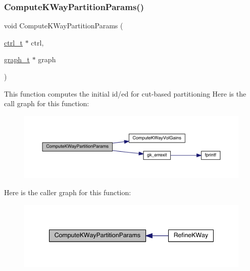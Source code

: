 \subsubsection{\texorpdfstring{Compute\+K\+Way\+Partition\+Params()}{ComputeKWayPartitionParams()}}
{\footnotesize\ttfamily void Compute\+K\+Way\+Partition\+Params (\begin{DoxyParamCaption}\item[{\hyperlink{a00742}{ctrl\+\_\+t} $\ast$}]{ctrl,  }\item[{\hyperlink{a00734}{graph\+\_\+t} $\ast$}]{graph }\end{DoxyParamCaption})}

This function computes the initial id/ed for cut-\/based partitioning Here is the call graph for this function\+:\nopagebreak
\begin{figure}[H]
\begin{center}
\leavevmode
\includegraphics[width=350pt]{a00915_afd723ab2f44ffaa25d1d9f1909e06dfd_cgraph}
\end{center}
\end{figure}
Here is the caller graph for this function\+:\nopagebreak
\begin{figure}[H]
\begin{center}
\leavevmode
\includegraphics[width=344pt]{a00915_afd723ab2f44ffaa25d1d9f1909e06dfd_icgraph}
\end{center}
\end{figure}
\mbox{\label{a00915_acd248e19a1ba82c235d52479e231e2f7}} 
